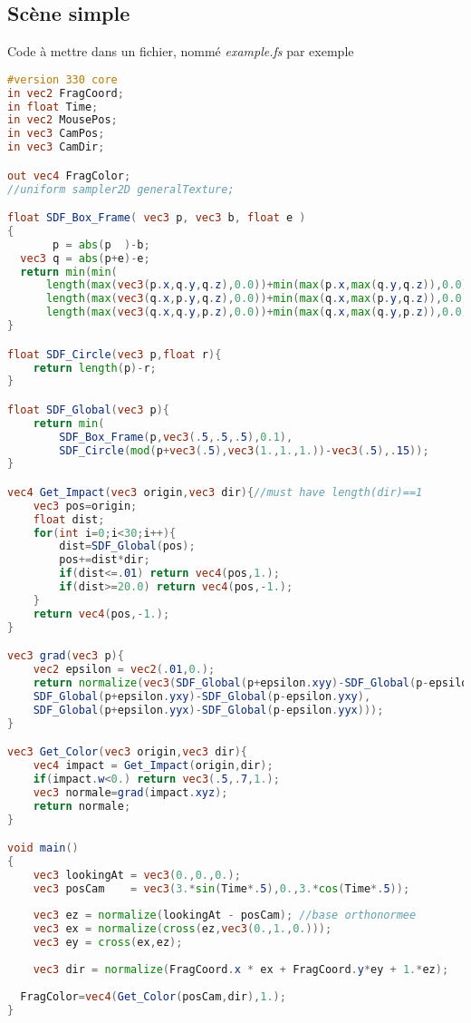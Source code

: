 \subsection{Scène simple}
Code à mettre dans un fichier, nommé \emph{example.fs} par exemple
\begin{lstlisting}[language=GLSL]
#version 330 core
in vec2 FragCoord;
in float Time;
in vec2 MousePos;
in vec3 CamPos;
in vec3 CamDir;

out vec4 FragColor;
//uniform sampler2D generalTexture;

float SDF_Box_Frame( vec3 p, vec3 b, float e )
{
       p = abs(p  )-b;
  vec3 q = abs(p+e)-e;
  return min(min(
      length(max(vec3(p.x,q.y,q.z),0.0))+min(max(p.x,max(q.y,q.z)),0.0),
      length(max(vec3(q.x,p.y,q.z),0.0))+min(max(q.x,max(p.y,q.z)),0.0)),
      length(max(vec3(q.x,q.y,p.z),0.0))+min(max(q.x,max(q.y,p.z)),0.0));
}

float SDF_Circle(vec3 p,float r){
    return length(p)-r;
}

float SDF_Global(vec3 p){
    return min(
        SDF_Box_Frame(p,vec3(.5,.5,.5),0.1),
        SDF_Circle(mod(p+vec3(.5),vec3(1.,1.,1.))-vec3(.5),.15));
}

vec4 Get_Impact(vec3 origin,vec3 dir){//must have length(dir)==1 
    vec3 pos=origin;
    float dist;
    for(int i=0;i<30;i++){
        dist=SDF_Global(pos);
        pos+=dist*dir;
        if(dist<=.01) return vec4(pos,1.);
        if(dist>=20.0) return vec4(pos,-1.);
    }
    return vec4(pos,-1.);
}

vec3 grad(vec3 p){
    vec2 epsilon = vec2(.01,0.);
    return normalize(vec3(SDF_Global(p+epsilon.xyy)-SDF_Global(p-epsilon.xyy),
    SDF_Global(p+epsilon.yxy)-SDF_Global(p-epsilon.yxy),
    SDF_Global(p+epsilon.yyx)-SDF_Global(p-epsilon.yyx)));
}

vec3 Get_Color(vec3 origin,vec3 dir){
    vec4 impact = Get_Impact(origin,dir);
    if(impact.w<0.) return vec3(.5,.7,1.);
    vec3 normale=grad(impact.xyz);
    return normale;
}

void main()
{
    vec3 lookingAt = vec3(0.,0.,0.);
    vec3 posCam    = vec3(3.*sin(Time*.5),0.,3.*cos(Time*.5));
    
    vec3 ez = normalize(lookingAt - posCam); //base orthonormee
    vec3 ex = normalize(cross(ez,vec3(0.,1.,0.)));
    vec3 ey = cross(ex,ez);
    
    vec3 dir = normalize(FragCoord.x * ex + FragCoord.y*ey + 1.*ez);
    
  FragColor=vec4(Get_Color(posCam,dir),1.);
}
\end{lstlisting}